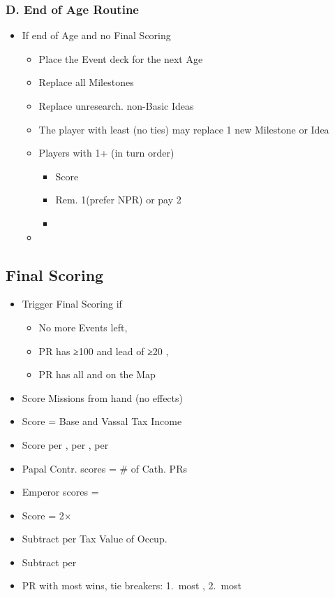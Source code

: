\documentclass[10pt]{article}
\begin{document}
\subsubsection*{D. End of Age Routine}
\begin{itemize}
	\item If end of Age and no Final Scoring
	\begin{itemize}
		\item Place the Event deck for the next Age
		\item Replace all Milestones
		\item Replace unresearch. non-Basic Ideas
		\item The player with least \prestige (no ties) may replace 1 new Milestone or Idea
		\item Players with 1+ \marriage (in turn order)
		\begin{itemize}
			\item Score 
			\item Rem. 1\marriage (prefer NPR) or pay 2\diplopower
			\item {}
		\end{itemize}
		\item {}
	\end{itemize}
\end{itemize}

\subsection*{Final Scoring}
\begin{itemize}
	\item Trigger Final Scoring if
	\begin{itemize}
		\item No more Events left, 
		\item PR has ≥100 \prestige and lead of ≥20 \prestige, 
		\item PR has all \towns and \vassals on the Map
	\end{itemize}
	\item Score Missions from hand (no effects)
	\item Score \prestige = Base and Vassal Tax Income
	\item Score  per \core,  per \marriage,  per \alliance
	\item Papal Contr. scores \prestige = \# of Cath. PRs
	\item Emperor scores \prestige = \authority
	\item Score \prestige = 2× \stability
	\item Subtract  per Tax Value of Occup. \towns
	\item Subtract  per \interest
	\item PR with most \prestige wins, tie breakers: 1.~most \monarchpower, 2.~most \ducats%
\end{itemize}
\end{document}
